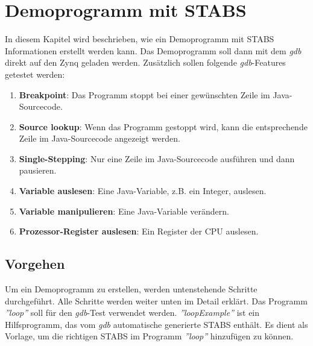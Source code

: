 \section{Demoprogramm mit STABS}
In diesem Kapitel wird beschrieben, wie ein Demoprogramm mit STABS Informationen erstellt werden kann.
Das Demoprogramm soll dann mit dem \textit{gdb} direkt auf den Zynq geladen werden.
Zusätzlich sollen folgende \textit{gdb}-Features getestet werden:\\
\begin{enumerate}
	\item \textbf{Breakpoint}: Das Programm stoppt bei einer gewünschten Zeile im Java-Sourcecode.
	\item \textbf{Source lookup}: Wenn das Programm gestoppt wird, kann die entsprechende Zeile im Java-Sourcecode angezeigt werden.
	\item \textbf{Single-Stepping}: Nur eine Zeile im Java-Sourcecode ausführen und dann pausieren.
	\item \textbf{Variable auslesen}: Eine Java-Variable, z.B. ein Integer, auslesen.
	\item \textbf{Variable manipulieren}: Eine Java-Variable verändern.
	\item \textbf{Prozessor-Register auslesen}: Ein Register der CPU auslesen.
\end{enumerate}

\subsection{Vorgehen}
Um ein Demoprogramm zu erstellen, werden untenstehende Schritte durchgeführt.
Alle Schritte werden weiter unten im Detail erklärt.
Das Programm \textit{''loop''} soll für den \textit{gdb}-Test verwendet werden.
\textit{''loopExample''} ist ein Hilfsprogramm, das vom \textit{gdb} automatische generierte STABS enthält.
Es dient als Vorlage, um die richtigen STABS im Programm \textit{''loop''} hinzufügen zu können.

